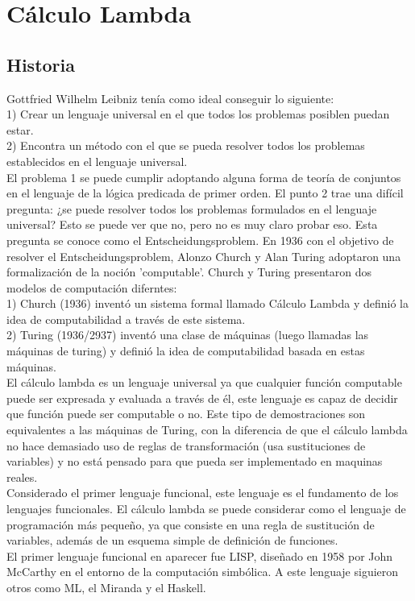 \chapter{Cálculo Lambda}
\label{chap:lambda}


\section{Historia}

Gottfried Wilhelm Leibniz tenía como ideal conseguir lo siguiente:\\
1) Crear un lenguaje universal en el que todos los problemas posiblen puedan estar.\\
2) Encontra un método con el que se pueda resolver todos los problemas establecidos en el lenguaje universal.\\
El problema 1 se puede cumplir adoptando alguna forma de teoría de conjuntos en el lenguaje de la lógica predicada de primer orden. El punto 2 trae una difícil pregunta: ¿se puede resolver todos los problemas formulados en el lenguaje universal? Esto se puede ver que no, pero no es muy claro probar eso. Esta pregunta se conoce como el Entscheidungsproblem.
En 1936 con el objetivo de resolver el Entscheidungsproblem, Alonzo Church y Alan Turing adoptaron una formalización de la noción 'computable'. Church y Turing presentaron dos modelos de computación diferntes:\\
1) Church (1936) inventó un sistema formal llamado Cálculo Lambda y definió la idea de computabilidad a través de este sistema.\\
2) Turing (1936/2937) inventó una clase de máquinas (luego llamadas las máquinas de turing) y definió la idea de computabilidad basada en estas máquinas.\\
El cálculo lambda es un lenguaje universal ya que cualquier función computable puede ser expresada y evaluada a través de él, este lenguaje es capaz de decidir que función puede ser computable o no. Este tipo de demostraciones son equivalentes a las máquinas de Turing, con la diferencia de que el cálculo lambda no hace demasiado uso de reglas de transformación (usa sustituciones de variables) y no está pensado para que pueda ser implementado en maquinas reales.\\
Considerado el primer lenguaje funcional, este lenguaje es el fundamento de los lenguajes funcionales. El cálculo lambda se puede considerar como el lenguaje de programación más pequeño, ya que consiste en una regla de sustitución de variables, además de un esquema simple de definición de funciones.\\
El primer lenguaje funcional en aparecer fue LISP, diseñado en 1958 por John McCarthy en el entorno de la computación simbólica. A este lenguaje siguieron otros como ML, el Miranda y el Haskell.

